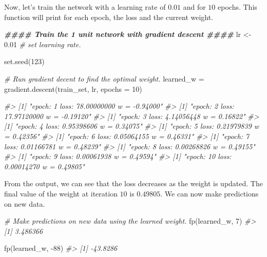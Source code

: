 \documentclass[
  11pt,
]{krantz}
\newenvironment{Shaded}{\begin{snugshade}}{\end{snugshade}}
\newcommand{\AttributeTok}[1]{\textcolor[rgb]{0.61,0.61,0.61}{#1}}
\newcommand{\CommentTok}[1]{\textcolor[rgb]{0.37,0.37,0.37}{\textit{#1}}}
\newcommand{\DecValTok}[1]{\textcolor[rgb]{0.06,0.06,0.06}{#1}}
\newcommand{\DocumentationTok}[1]{\textcolor[rgb]{0.37,0.37,0.37}{\textbf{\textit{#1}}}}
\newcommand{\FloatTok}[1]{\textcolor[rgb]{0.06,0.06,0.06}{#1}}
\newcommand{\FunctionTok}[1]{\textcolor[rgb]{0,0,0}{#1}}
\newcommand{\NormalTok}[1]{#1}
\newcommand{\OtherTok}[1]{\textcolor[rgb]{0.37,0.37,0.37}{#1}}
\newcommand{\SpecialCharTok}[1]{\textcolor[rgb]{0,0,0}{#1}}
\begin{document}
Now, let's train the network with a learning rate of \(0.01\) and for \(10\) epochs. This function will print for each epoch, the loss and the current weight.

\begin{Shaded}
\begin{Highlighting}[]
\DocumentationTok{\#\#\#\# Train the 1 unit network with gradient descent \#\#\#\#}
\NormalTok{lr }\OtherTok{\textless{}{-}} \FloatTok{0.01} \CommentTok{\# set learning rate.}

\FunctionTok{set.seed}\NormalTok{(}\DecValTok{123}\NormalTok{)}

\CommentTok{\# Run gradient decent to find the optimal weight.}
\NormalTok{learned\_w }\OtherTok{=} \FunctionTok{gradient.descent}\NormalTok{(train\_set, lr, }\AttributeTok{epochs =} \DecValTok{10}\NormalTok{)}

\CommentTok{\#\textgreater{} [1] "epoch: 1 loss: 78.00000000 w = {-}0.94000"}
\CommentTok{\#\textgreater{} [1] "epoch: 2 loss: 17.97120000 w = {-}0.19120"}
\CommentTok{\#\textgreater{} [1] "epoch: 3 loss: 4.14056448 w = 0.16822"}
\CommentTok{\#\textgreater{} [1] "epoch: 4 loss: 0.95398606 w = 0.34075"}
\CommentTok{\#\textgreater{} [1] "epoch: 5 loss: 0.21979839 w = 0.42356"}
\CommentTok{\#\textgreater{} [1] "epoch: 6 loss: 0.05064155 w = 0.46331"}
\CommentTok{\#\textgreater{} [1] "epoch: 7 loss: 0.01166781 w = 0.48239"}
\CommentTok{\#\textgreater{} [1] "epoch: 8 loss: 0.00268826 w = 0.49155"}
\CommentTok{\#\textgreater{} [1] "epoch: 9 loss: 0.00061938 w = 0.49594"}
\CommentTok{\#\textgreater{} [1] "epoch: 10 loss: 0.00014270 w = 0.49805"}
\end{Highlighting}
\end{Shaded}

From the output, we can see that the loss decreases as the weight is updated. The final value of the weight at iteration \(10\) is \(0.49805\). We can now make predictions on new data.

\begin{Shaded}
\begin{Highlighting}[]
\CommentTok{\# Make predictions on new data using the learned weight.}
\FunctionTok{fp}\NormalTok{(learned\_w, }\DecValTok{7}\NormalTok{)}
\CommentTok{\#\textgreater{} [1] 3.486366}

\FunctionTok{fp}\NormalTok{(learned\_w, }\SpecialCharTok{{-}}\DecValTok{88}\NormalTok{)}
\CommentTok{\#\textgreater{} [1] {-}43.8286}
\end{Highlighting}
\end{Shaded}
\end{document}
